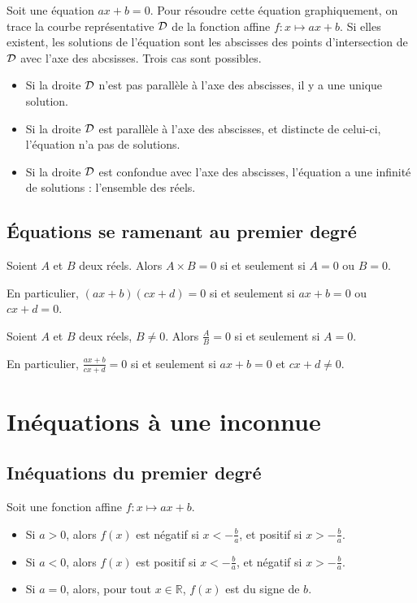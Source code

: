 \begin{methode}
  Soit une équation $ax+b=0$. Pour résoudre cette équation graphiquement, on trace la courbe représentative $\cal D$ de la fonction affine $f:x\mapsto ax+b$.
  Si elles existent, les solutions de l'équation sont les abscisses des points d'intersection de $\cal D$ avec l'axe des abcsisses.
  Trois cas sont possibles.
  \begin{itemize}
    \item Si la droite $\cal D$ n'est pas parallèle à l'axe des abscisses, il y a une unique solution.
    \item Si la droite $\cal D$ est parallèle à l'axe des abscisses, et distincte de celui-ci, l'équation n'a pas de solutions.
    \item Si la droite $\cal D$ est confondue avec l'axe des abscisses, l'équation a une infinité de solutions : l'ensemble des réels.
  \end{itemize}
\end{methode}

\subsection{Équations se ramenant au premier degré}

\begin{propriete}
  Soient $A$ et $B$ deux réels. Alors $A\times B=0$ si et seulement si $A=0$ ou $B=0$.

  En particulier, $(ax+b)(cx+d)=0$ si et seulement si $ax+b=0$ ou $cx+d=0$.
\end{propriete}

\begin{propriete}
  Soient $A$ et $B$ deux réels, $B\neq0$. Alors $\frac{A}{B}=0$ si et seulement
  si $A=0$.

  En particulier, $\frac{ax+b}{cx+d}=0$ si et seulement si $ax+b=0$ et $cx+d\neq0$.
\end{propriete}

\section{Inéquations à une inconnue}

\subsection{Inéquations du premier degré}

\begin{propriete}
  Soit une fonction affine $f:x\mapsto ax+b$.
  \begin{itemize}
    \item Si $a>0$, alors $f(x)$ est négatif si $x<-\frac{b}{a}$, et positif si $x>-\frac{b}{a}$.
    \item Si $a<0$, alors $f(x)$ est positif si $x<-\frac{b}{a}$, et négatif si $x>-\frac{b}{a}$.
    \item Si $a=0$, alors, pour tout $x\in{\mathbb R}$, $f(x)$ est du signe de $b$.
  \end{itemize}
\end{propriete}

